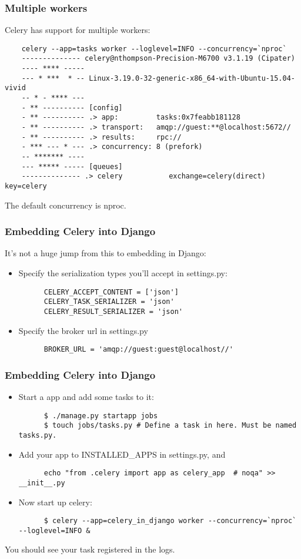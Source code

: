 \documentclass[9pt]{beamer}
\begin{document}
\begin{frame}[fragile]
  \frametitle{Multiple workers}
  Celery has support for multiple workers:
  \begin{verbatim}
    celery --app=tasks worker --loglevel=INFO --concurrency=`nproc`
    -------------- celery@nthompson-Precision-M6700 v3.1.19 (Cipater)
    ---- **** -----
    --- * ***  * -- Linux-3.19.0-32-generic-x86_64-with-Ubuntu-15.04-vivid
    -- * - **** ---
    - ** ---------- [config]
    - ** ---------- .> app:         tasks:0x7feabb181128
    - ** ---------- .> transport:   amqp://guest:**@localhost:5672//
    - ** ---------- .> results:     rpc://
    - *** --- * --- .> concurrency: 8 (prefork)
    -- ******* ----
    --- ***** ----- [queues]
    -------------- .> celery           exchange=celery(direct) key=celery
  \end{verbatim}
  The default concurrency is nproc.
\end{frame}

\begin{frame}[fragile]
  \frametitle{Embedding Celery into Django}
  It's not a huge jump from this to embedding in Django:
  \begin{itemize}
  \item Specify the serialization types you'll accept in settings.py:
    \begin{verbatim}
      CELERY_ACCEPT_CONTENT = ['json']
      CELERY_TASK_SERIALIZER = 'json'
      CELERY_RESULT_SERIALIZER = 'json'
    \end{verbatim}
    \pause
  \item Specify the broker url in settings.py
    \begin{verbatim}
      BROKER_URL = 'amqp://guest:guest@localhost//'
    \end{verbatim}
  \end{itemize}
\end{frame}

\begin{frame}[fragile]
  \frametitle{Embedding Celery into Django}
  \begin{itemize}
  \item Start a app and add some tasks to it:
    \begin{verbatim}
      $ ./manage.py startapp jobs
      $ touch jobs/tasks.py # Define a task in here. Must be named tasks.py.
    \end{verbatim}
    \pause
  \item Add your app to INSTALLED\_APPS in settings.py, and
    \begin{verbatim}
      echo "from .celery import app as celery_app  # noqa" >> __init__.py
    \end{verbatim}
    \pause
  \item Now start up celery:
    \begin{verbatim}
      $ celery --app=celery_in_django worker --concurrency=`nproc` --loglevel=INFO &
    \end{verbatim}
  \end{itemize}
  You should see your task registered in the logs.
\end{frame}
\end{document}
